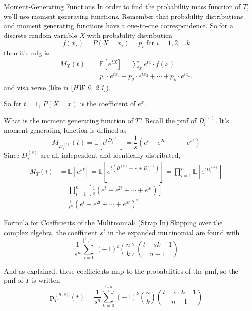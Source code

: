 \documentclass{beamer}
\begin{document}
\begin{frame}{Moment-Generating Functions}
    In order to find the probability mass function of $T$, we'll use moment generating functions. Remember that probability distributions and moment generating functions have a one-to-one correspondence. So for a discrete random variable $X$ with probability distribution
    $$ 
    f(x_i) = P(X = x_i) = p_i \text{ for } i = 1, 2, \ldots k 
    $$
    then it's mfg is
    \begin{align*}
        M_X(t) &= \mathbb{E}[e^{tX}] = \sum_{x} e^{tx} \cdot f(x) =  \\ 
        &= p_1 \cdot e^{tx_1} + p_2 \cdot e^{tx_2} + \cdots + p_k \cdot e^{tx_k}.
    \end{align*}
    and visa verse (like in [\textit{HW 6, 2.1}]).

    So for $t = 1$, $P(X = x)$ is the coefficient of $e^x$. 
\end{frame}

\begin{frame}{What is the moment generating function of $T$?}
    Recall the pmf of $D_{i}^{(s)}$. It's moment generating function is defined as
    $$
    M_{D_{i}^{(s)}}(t) = \mathbb{E}[e^{tD_{i}^{(s)}}] = \frac{1}{s}(e^{t} + e^{2t} + \cdots + e^{st})
    $$
    Since $D_{i}^{(s)}$ are all independent and identically distributed,
    \begin{align*}
        M_{T}(t) &= \mathbb{E}[e^{tT}] = \mathbb{E}[e^{t(D_{1}^{(s)} + \cdots + D_{n}^{(s)})}] = \prod_{i = 1}^{n} \mathbb{E}[e^{tD_{i}^{(s)}}] \\
        &= \prod_{i = 1}^{n} \left[\frac{1}{s}(e^{t} + e^{2t} + \cdots + e^{st}) \right] \\
        &= \frac{1}{s^n} (e^{t} + e^{2t} + \cdots + e^{st})^n
    \end{align*}
\end{frame}


\begin{frame}{Formula for Coefficients of the Mulitnomials (Strap In)}
    Skipping over the complex algebra, the coefficient $x^t$ in the expanded multinomial are found with
    $$
    \frac{1}{s^n} \sum_{k = 0}^{\lfloor\frac{t-n}{s} \rfloor} (-1)^k \binom{n}{k} \binom{t-sk-1}{n-1}
    $$ 

    And as explained, these coefficients map to the probabilities of the pmf, so the pmf of $T$ is written
    $$
    \textbf{p}_{T}^{(n, s)}(t) = \frac{1}{s^n} \sum_{k = 0}^{\lfloor\frac{t-n}{s} \rfloor} (-1)^k \binom{n}{k} \binom{t - s \cdot k - 1}{n-1}
    $$
\end{frame}
\end{document}

